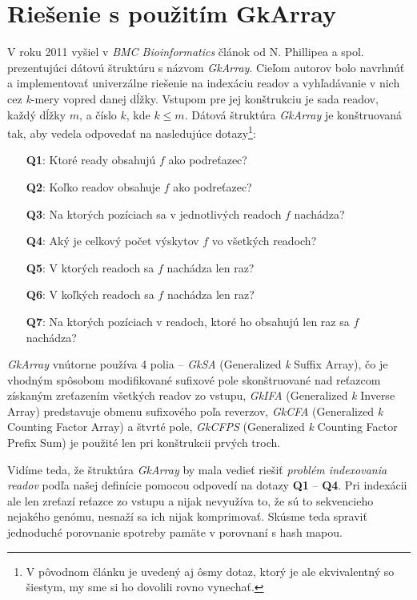
\section{Riešenie s použitím GkArray}
\label{sec:riesenie_s_pouzitim_gkarray}
V roku 2011 vyšiel v \emph{BMC Bioinformatics} článok od N. Phillipea a spol.\cite{NP11} prezentujúci dátovú štruktúru s názvom \emph{GkArray}. Cieľom autorov bolo navrhnúť a implementovať univerzálne riešenie na indexáciu readov a vyhľadávanie v nich cez \emph{k}-mery vopred danej dĺžky. Vstupom pre jej konštrukciu je sada readov, každý dĺžky $m$, a číslo $k$, kde $k \leq m$. Dátová štruktúra \emph{GkArray} je konštruovaná tak, aby vedela odpovedať na nasledujúce dotazy\footnote{V pôvodnom článku je uvedený aj ôsmy dotaz, ktorý je ale ekvivalentný so šiestym, my sme si ho dovolili rovno vynechať.}:

\begin{itemize}
    \item[\textbf{Q1}:]{Ktoré ready obsahujú $f$ ako podreťazec?}
    \item[\textbf{Q2}:]{Koľko readov obsahuje $f$ ako podreťazec?}
    \item[\textbf{Q3}:]{Na ktorých pozíciach sa v jednotlivých readoch $f$ nachádza?}
    \item[\textbf{Q4}:]{Aký je celkový počet výskytov $f$ vo všetkých readoch?}
    \item[\textbf{Q5}:]{V ktorých readoch sa $f$ nachádza len raz?}
    \item[\textbf{Q6}:]{V koľkých readoch sa $f$ nachádza len raz?}
    \item[\textbf{Q7}:]{Na ktorých pozíciach v readoch, ktoré ho obsahujú len raz sa $f$ nachádza?}
\end{itemize}

\emph{GkArray} vnútorne používa 4 polia -- \emph{GkSA} (Generalized \emph{k} Suffix Array), čo je vhodným spôsobom modifikované sufixové pole skonštruované nad reťazcom získaným zreťazením všetkých readov zo vstupu, \emph{GkIFA} (Generalized \emph{k} Inverse Array) predstavuje obmenu sufixového poľa reverzov, \emph{GkCFA} (Generalized \emph{k} Counting Factor Array) a štvrté pole, \emph{GkCFPS} (Generalized \emph{k} Counting Factor Prefix Sum) je použité len pri konštrukcii prvých troch.


Vidíme teda, že štruktúra \emph{GkArray} by mala vedieť riešiť \emph{problém indexovania readov} podľa našej definície pomocou odpovedí na dotazy \textbf{Q1} -- \textbf{Q4}. Pri indexácii ale len zreťazí reťazce zo vstupu a nijak nevyužíva to, že sú to sekvencieho nejakého genómu, nesnaží sa ich nijak komprimovať. Skúsme teda spraviť jednoduché porovnanie spotreby pamäte v porovnaní s hash mapou.

